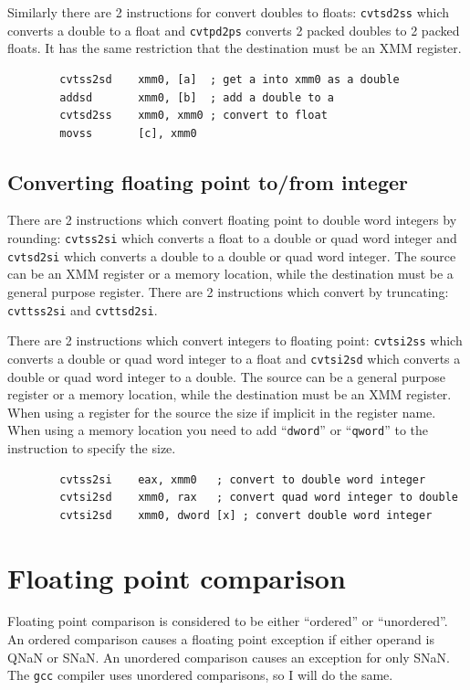 \documentclass[11pt,b5paper]{book}
\begin{document}
Similarly there are 2 instructions for convert doubles to floats:
{\tt cvtsd2ss} which converts a double to a float and
{\tt cvtpd2ps} converts 2 packed doubles to 2 packed floats.
It has the same restriction that the destination must be an XMM register.

\begin{verbatim}
        cvtss2sd    xmm0, [a]  ; get a into xmm0 as a double
        addsd       xmm0, [b]  ; add a double to a
        cvtsd2ss    xmm0, xmm0 ; convert to float
        movss       [c], xmm0
\end{verbatim}

\subsection{Converting floating point to/from integer}

There are 2 instructions which convert floating point to double word integers by rounding:
{\tt cvtss2si} which converts a float to a double or quad word integer and
{\tt cvtsd2si} which converts a double to a double or quad word integer.
The source can be an XMM register or a memory location, while the destination must be a general purpose
register.
There are 2 instructions which convert by truncating: {\tt cvttss2si} and {\tt cvttsd2si}.

There are 2 instructions which convert integers to floating point:
{\tt cvtsi2ss} which converts a double or quad word integer to a float and
{\tt cvtsi2sd} which converts a double or quad word integer to a double.
The source can be a general purpose register or a memory location, while the 
destination must be an XMM register.
When using a register for the source the size if implicit in the register name.
When using a memory location you need to add ``{\tt dword}'' or ``{\tt qword}'' to the
instruction to specify the size.

\begin{verbatim}
        cvtss2si    eax, xmm0   ; convert to double word integer
        cvtsi2sd    xmm0, rax   ; convert quad word integer to double
        cvtsi2sd    xmm0, dword [x] ; convert double word integer
\end{verbatim}


\section{Floating point comparison}

Floating point comparison is considered to be either ``ordered'' or ``unordered''.
An ordered comparison causes a floating point exception if either operand is QNaN or SNaN.
An unordered comparison causes an exception for only SNaN.
The {\tt gcc} compiler uses unordered comparisons, so I will do the same.
\end{document}
